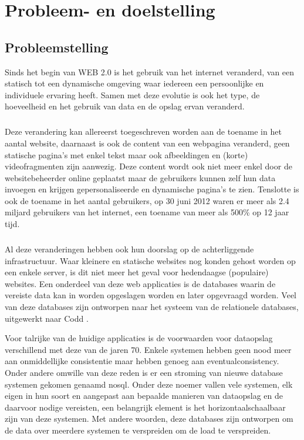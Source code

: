 \documentclass{book}
\begin{document}


\chapter{Probleem- en doelstelling}

\section{Probleemstelling}
Sinds het begin van WEB 2.0 is het gebruik van het internet veranderd, van een statisch tot een dynamische omgeving waar iedereen een persoonlijke en individuele ervaring heeft. Samen met deze evolutie is ook het type, de hoeveelheid en het gebruik van data en de opslag ervan veranderd. 

\paragraph{}
Deze verandering kan allereerst toegeschreven worden aan de toename in het aantal website, daarnaast is ook de content van een webpagina veranderd, geen statische pagina's met enkel tekst maar ook afbeeldingen en (korte) videofragmenten zijn aanwezig. Deze content wordt ook niet meer enkel door de websitebeheerder online geplaatst maar de gebruikers kunnen zelf hun data invoegen en krijgen gepersonaliseerde en dynamische pagina's te zien. 
Tenslotte is ook de toename in het aantal gebruikers, op 30 juni 2012 waren er meer als 2.4 miljard gebruikers van het internet, een toename van meer als 500\% op 12 jaar tijd.  
\cite{WorldInternetStatics}

\paragraph{}
Al deze veranderingen hebben ook hun doorslag op de achterliggende infrastructuur. Waar kleinere en statische websites nog konden gehost worden op een enkele server, is dit niet meer het geval voor hedendaagse (populaire) websites. 
Een onderdeel van deze web applicaties is de databases waarin de vereiste data kan in worden opgeslagen worden en later opgevraagd worden. Veel van deze databases zijn ontworpen naar het systeem van de relationele databases, uitgewerkt naar Codd \cite{Codd:1970:RMD:362384.362685}.

Voor talrijke van de huidige applicaties is de voorwaarden voor dataopslag verschillend met deze van de jaren 70. Enkele systemen hebben geen nood meer aan onmiddellijke consistentie maar hebben genoeg aan \gls{eventualconsistency}. Onder andere omwille van deze reden is er een stroming van nieuwe database systemen gekomen genaamd \gls{nosql}. Onder deze noemer vallen vele systemen, elk eigen in hun soort en aangepast aan bepaalde manieren van dataopslag en de daarvoor nodige vereisten, een belangrijk element is het \gls{horizontaalschaalbaar} zijn van deze systemen. Met andere woorden, deze databases zijn ontworpen om de data over meerdere systemen te verspreiden om de load te verspreiden. 
\end{document}
